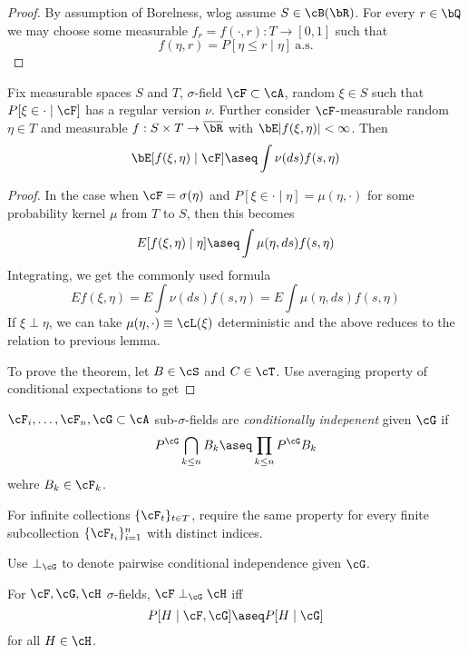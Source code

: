 \begin{proof}
  By assumption of Borelness, wlog assume $S \in \cB(\bR)$.
  For every $r \in \bQ$ we may choose some measurable
  $f_r = f(\cdot, r) : T \to [0,1]$ such that
  \[
    f(\eta, r) = P[\eta \leq r \mid \eta]~\text{a.s.}
  \]
\end{proof}

\begin{theorem}[Disintegration]
  Fix measurable spaces $S$ and $T$, $\sigma$-field $\cF \subset \cA$,
  random $\xi \in S$ such that $P[\xi \in \cdot \mid \cF]$ has a regular
  version $\nu$.
  Further consider $\cF$-measurable random $\eta \in T$ and
  measurable $f : S \times T \to \overline{\bR}$
  with $\bE \lvert f(\xi, \eta) \rvert < \infty$. Then
  \[
    \bE[f(\xi, \eta) \mid \cF] \aseq \int \nu(ds) f(s, \eta)
  \]
\end{theorem}

\begin{proof}
  In the case when $\cF = \sigma(\eta)$ and
  $P[\xi \in \cdot \mid \eta] = \mu(\eta, \cdot)$
  for some probability kernel $\mu$
  from $T$ to $S$, then this becomes
  \[
    E[f(\xi, \eta) \mid \eta] \aseq \int \mu(\eta, ds) f(s, \eta)
  \]
  Integrating, we get the commonly used formula
  \[
    E f(\xi, \eta) = E\int\nu(ds) f(s, \eta) = E \int \mu(\eta, ds) f(s, \eta)
  \]
  If $\xi \perp \eta$, we can take $\mu(\eta, \cdot) \equiv \cL(\xi)$
  deterministic and the above reduces to the relation to previous lemma.


  To prove the theorem, let $B \in \cS$ and $C \in \cT$. Use averaging property of conditional
  expectations to get
\end{proof}

\begin{definition}
  $\cF_i, \ldots, \cF_n, \cG \subset \cA$ sub-$\sigma$-fields are
  \emph{conditionally indepenent} given $\cG$ if
  \[
    P^\cG \bigcap_{k \leq n} B_k \aseq \prod_{k \leq n} P^\cG B_k
  \]
  wehre $B_k \in \cF_k$.

  For infinite collections $\{\cF_t\}_{t \in T}$, require the same
  property for every finite subcollection
  $\{\cF_{t_i}\}_{i=1}^n$ with distinct indices.

  Use $\perp_\cG$ to denote pairwise conditional independence
  given $\cG$.
\end{definition}

\begin{proposition}
  For $\cF, \cG, \cH$ $\sigma$-fields, $\cF \perp_{\cG} \cH$
  iff
  \[
    P[H \mid \cF, \cG] \aseq P[H \mid \cG]
  \]
  for all $H \in \cH$.
\end{proposition}

